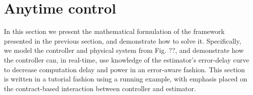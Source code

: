\section{Anytime control}
\label{controlProblem}
In this section we present the mathematical formulation of the framework presented in the previous section, and demonstrate how to solve it.
Specifically, we model the controller and physical system from Fig. ??, and demonstrate how the controller can, in real-time, use knowledge of the estimator's error-delay curve to decrease computation delay and power in an error-aware fashion.
This section is written in a tutorial fashion using a running example, with emphasis placed on the contract-based interaction between controller and estimator.



